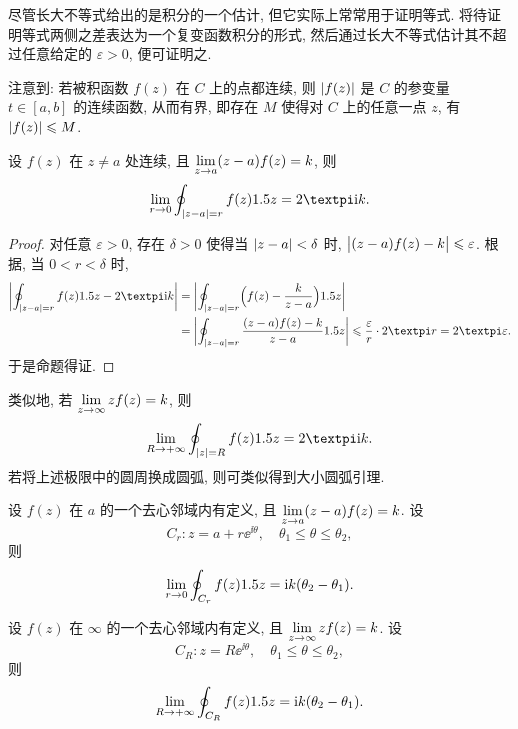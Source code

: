 尽管长大不等式给出的是积分的一个估计, 但它实际上常常用于证明等式.
将待证明等式两侧之差表达为一个复变函数积分的形式, 然后通过长大不等式估计其不超过任意给定的 $\varepsilon>0$, 便可证明之.

注意到: 若被积函数 $f(z)$ 在 $C$ 上的点都连续, 则 $\lvert f(z)\rvert$ 是 $C$ 的参变量 $t\in[a,b]$ 的连续函数, 从而有界, 即存在 $M$ 使得对 $C$ 上的任意一点 $z$, 有 $\lvert f(z)\rvert\leqslant M$.

\begin{example}
  设 $f(z)$ 在 $z\neq a$ 处连续, 且 $\lim\limits_{z\rightarrow a}(z-a)f(z)=k$, 则
  \[
    \lim_{r\ra0}\oint_{\abs{z-a}=r}f(z)\d z=2\cpi\ii k.
  \]
\end{example}

\begin{proof}
  对任意 $\varepsilon>0$, 存在 $\delta>0$ 使得当 $\lvert z-a\rvert<\delta$ 时, $\bigl\vert(z-a)f(z)-k\bigr\vert\leqslant\varepsilon$.
  根据, 当 $0<r<\delta$ 时,
  \begin{align*}
      \biggabs{\oint_{\abs{z-a}=r}f(z)\d z-2\cpi\ii k}&
    =\biggabs{\oint_{\abs{z-a}=r}\Bigl(f(z)-\frac k{z-a}\Bigr)\d z}\\&
    =\biggabs{\oint_{\abs{z-a}=r}\frac{(z-a)f(z)-k}{z-a}\d z}
    \le \frac{\varepsilon}r\cdot 2\cpi r
    =2\cpi\varepsilon.
  \end{align*}
  于是命题得证.
\end{proof}

类似地, 若 $\lim\limits_{z\rightarrow \infty} zf(z)=k$, 则
\[
  \lim_{R\ra+\infty}\oint_{\abs{z}=R}f(z)\d z=2\cpi\ii k.
\]
若将上述极限中的圆周换成圆弧, 则可类似得到大小圆弧引理.

\begin{theorem}[大小圆弧引理]
  \label{thm:arc}
  \begin{enuma}
    \item 设 $f(z)$ 在 $a$ 的一个去心邻域内有定义, 且 $\lim\limits_{z\rightarrow a}(z-a)f(z)=k$.
      设
      \[
        C_r: z=a+r\ee^{\ii \theta},\quad \theta_1\le\theta\le\theta_2,
      \]
      则
      \[
        \lim_{r\rightarrow0}\oint_{C_r}f(z)1.5 z=\mathrm{i} k(\theta_2-\theta_1).
      \]
    \item 设 $f(z)$ 在 $\infty$ 的一个去心邻域内有定义, 且 $\lim\limits_{z\rightarrow\infty}zf(z)=k$.
      设
      \[
        C_R: z=R\ee^{\ii \theta},\quad \theta_1\le\theta\le\theta_2,
      \]
      则
      \[
        \lim_{R\rightarrow+\infty}\oint_{C_R}f(z)1.5 z=\mathrm{i} k(\theta_2-\theta_1).
      \]
  \end{enuma}
\end{theorem}

